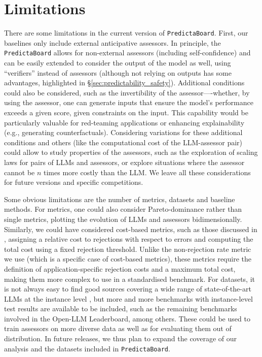 \documentclass[11pt]{article}
\newcommand{\predbench}{{\tt PredictaBoard}\xspace}
\begin{document}
\newpage
\section{Limitations}\label{sec:limitations}

There are some limitations in the current version of \predbench. First, our baselines only include external anticipative assessors. In principle, the \predbench allows for non-external assessors (including self-confidence) and can be easily extended to consider the output of the model as well, using ``verifiers'' instead of assessors (although not relying on outputs has some advantages, highlighted in \S\ref{sec:predictability_safety}). Additional conditions could also be considered, such as the invertibility of the assessor—-whether, by using the assessor, one can generate inputs that ensure the model's performance exceeds a given score, given constraints on the input. This capability would be particularly valuable for red-teaming applications or enhancing explainability (e.g., generating counterfactuals). Considering variations for these additional conditions and others (like the computational cost of the LLM-assessor pair) could 
allow to study properties of the assessors, such as the exploration of scaling laws for pairs of LLMs and assessors, or explore situations where the assessor cannot be  $n$ times more costly than the LLM. We leave all these considerations for future versions and specific competitions.

Some obvious limitations are the number of metrics, datasets and baseline methods. For metrics, one could also consider Pareto-dominance rather than single metrics, plotting the evolution of LLMs and assessors bidimensionally. Similarly, we could have considered cost-based metrics, such as those discussed in \citealp[Section 3.3]{hendrickx2024machine}, assigning a relative cost to rejections with respect to errors and computing the total cost using a fixed rejection threshold. 
Unlike the non-rejection rate metric we use (which is a specific case of cost-based metrics), these metrics require the definition of application-specific rejection costs and a maximum total cost, making them more complex to use in a standardised benchmark. For datasets, it is not always easy to find good sources covering a wide range of state-of-the-art LLMs at the instance level \cite{burnell2023rethink}, but more and more benchmarks with instance-level test results are available to be included, such as the remaining benchmarks involved in the Open-LLM Leaderboard, among others. These could be used to train assessors on more diverse data as well as for evaluating them out of distribution. In future releases, we thus plan to expand the coverage of our analysis and the datasets included in \predbench.
\end{document}
